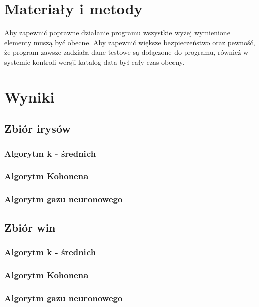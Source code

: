 \documentclass{classrep}
\begin{document}
\section{Materiały i metody}
{Aby zapewnić poprawne działanie programu wszystkie wyżej wymienione elementy muszą być obecne. Aby zapewnić większe bezpieczeństwo oraz pewność, że program zawsze zadziała dane testowe są dołączone do programu, również w systemie kontroli wersji katalog data był cały czas obecny. 
}

\section{Wyniki}
{
	\subsection{Zbiór irysów}
	{
		\subsubsection{Algorytm k - średnich}
		{

		}

		\subsubsection{Algorytm Kohonena}
		{

		}

		\subsubsection{Algorytm gazu neuronowego}
		{

		}
	}
	\subsection{Zbiór win}
	{
		\subsubsection{Algorytm k - średnich}
		{

		}

		\subsubsection{Algorytm Kohonena}
		{

		}

		\subsubsection{Algorytm gazu neuronowego}
		{

}}}
\end{document}

